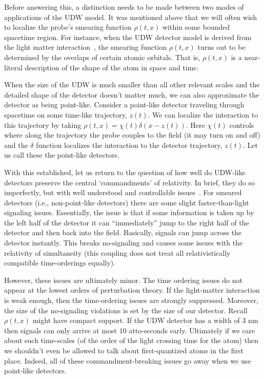 \documentclass[prd,twocolumn,superscriptaddress,floatfix,amsmath,amssymb,amsfonts,nofootinbib]{revtex4-2}
\begin{document}
Before answering this, a distinction needs to be made between two modes of applications of the UDW model. It was mentioned above that we will often wish to localize the probe's smearing function $\rho(t,x)$ within some bounded spacetime region. For instance, when the UDW detector model is derived from the light matter interaction~\cite{Pablo,RichardEdu,Richard}, the smearing function $\rho(t,x)$ turns out to be determined by the overlaps of certain atomic orbitals. That is, $\rho(t,x)$ is a near-literal description of the shape of the atom in space and time. 

When the size of the UDW is much smaller than all other relevant scales and the detailed shape of the detector doesn't matter much, we can also approximate the detector as being point-like. Consider a point-like detector traveling through spacetime on some time-like trajectory, $z(t)$. We can localize the interaction to this trajectory by taking \mbox{$\rho(t,x)=\chi(t)\delta(x-z(t))$}. Here $\chi(t)$ controls where along the trajectory the probe couples to the field (it may turn on and off) and the $\delta$ function localizes the interaction to the detector trajectory, $z(t)$. Let us call these the point-like detectors.

With this established, let us return to the question of how well do UDW-like detectors preserve the central `commandments' of relativity. In brief, they do so imperfectly, but with well understood and controllable issues~\cite{BrokenCovariance,JoseMariaEdu}. For smeared detectors (i.e., non-point-like detectors) there are some slight faster-than-light signaling issues. Essentially, the issue is that if some information is taken up by the left half of the detector it can ``immediately'' jump to the right half of the detector and then back into the field. Basically, signals can jump across the detector instantly. This breaks no-signaling and causes some issues with the relativity of simultaneity (this coupling does not treat all relativistically compatible time-orderings equally). 

However, these issues are ultimately minor. The time ordering issues do not appear at the lowest orders of perturbation theory. If the light-matter interaction is weak enough, then the time-ordering issues are strongly suppressed. Moreover, the size of the no-signaling violations is set by the size of our detector. Recall $\rho(t,x)$ might have compact support. If the UDW detector has a width of $3\text{ nm}$ then signals can only arrive at most $10$ atto-seconds early. Ultimately if we care about such time-scales (of the order of the light crossing time for the atom) then we shouldn't even be allowed to talk about first-quantized atoms in the first place. Indeed, all of these commandment-breaking issues go away when we use point-like detectors.
\end{document}
